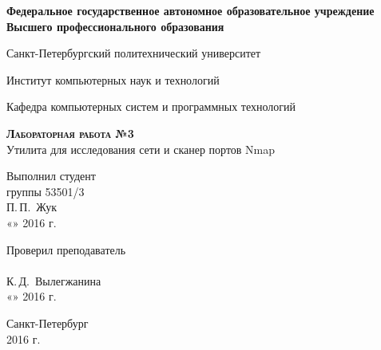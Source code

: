 \documentclass[10pt,a4paper,titlepage]{article}
\begin{document}
\begin{titlepage}
  \begin{center}
    \large
    \textbf{Федеральное государственное автономное образовательное учреждение\\
    Высшего профессионального образования}

    \vspace{0.25cm}

    Санкт-Петербургский политехнический университет
    \vspace{0.25cm}
    
    Институт компьютерных наук и технологий
    \vspace{0.25cm}
    
    Кафедра компьютерных систем и программных технологий
    \vfill

    \textbf{\textsc{Лабораторная работа №3}}\\[5mm]
    
    {\LARGE Утилита для исследования сети и сканер портов Nmap}
  \bigskip
    
\end{center}
\vfill

\newlength{\ML}
\hfill\begin{minipage}{0.4\textwidth}
  Выполнил студент\\ группы 53501/3\\
  \underline{\hspace{\ML}} П.\,П.~Жук\\
  «\underline{\hspace{0.7cm}}» \underline{\hspace{2cm}} 2016 г.
\end{minipage}%
\bigskip

\hfill\begin{minipage}{0.4\textwidth}
  Проверил преподаватель\\
  \underline{\hspace{\ML}}\\ К.\,Д.~Вылегжанина\\
  «\underline{\hspace{0.7cm}}» \underline{\hspace{2cm}} 2016 г.
\end{minipage}%
\vfill

\begin{center}
  Санкт-Петербург\\ 2016 г.
\end{center}
\end{titlepage}
\end{document}
